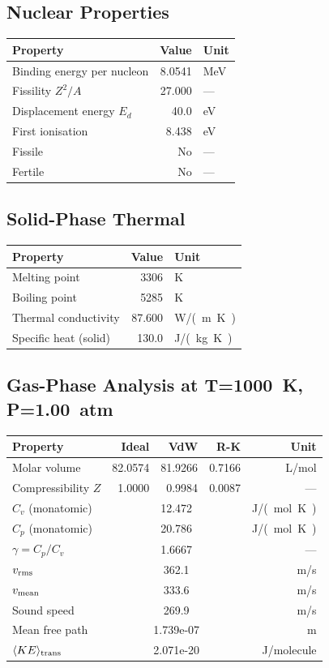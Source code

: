 \documentclass[11pt,a4paper]{article}
\begin{document}
\subsection{Nuclear Properties}
\begin{tabular}{lrl}
  \toprule
  Property & Value & Unit \\
  \midrule
  Binding energy per nucleon & 8.0541 & \si{MeV} \\
  Fissility $Z^2/A$ & 27.000 & --- \\
  Displacement energy $E_d$ & 40.0 & \si{eV} \\
  First ionisation & 8.438 & \si{eV} \\
  Fissile & No & --- \\
  Fertile & No & --- \\
  \bottomrule
\end{tabular}

\subsection{Solid-Phase Thermal}
\begin{tabular}{lrl}
  \toprule
  Property & Value & Unit \\
  \midrule
  Melting point & 3306 & \si{K} \\
  Boiling point & 5285 & \si{K} \\
  Thermal conductivity & 87.600 & \si{W/(m.K)} \\
  Specific heat (solid) & 130.0 & \si{J/(kg.K)} \\
  \bottomrule
\end{tabular}

\subsection{Gas-Phase Analysis at T=\SI{1000}{K}, P=\SI{1.00}{atm}}
\begin{tabular}{lrrrr}
  \toprule
  Property & Ideal & VdW & R-K & Unit \\
  \midrule
  Molar volume & 82.0574 & 81.9266 & 0.7166 & \si{L/mol} \\
  Compressibility $Z$ & 1.0000 & 0.9984 & 0.0087 & --- \\
  \midrule
  $C_v$ (monatomic) & \multicolumn{3}{c}{12.472} & \si{J/(mol.K)} \\
  $C_p$ (monatomic) & \multicolumn{3}{c}{20.786} & \si{J/(mol.K)} \\
  $\gamma = C_p/C_v$ & \multicolumn{3}{c}{1.6667} & --- \\
  $v_{\rm rms}$ & \multicolumn{3}{c}{362.1} & \si{m/s} \\
  $v_{\rm mean}$ & \multicolumn{3}{c}{333.6} & \si{m/s} \\
  Sound speed & \multicolumn{3}{c}{269.9} & \si{m/s} \\
  Mean free path & \multicolumn{3}{c}{1.739e-07} & \si{m} \\
  $\langle KE \rangle_{\rm trans}$ & \multicolumn{3}{c}{2.071e-20} & \si{J/molecule} \\
  \bottomrule
\end{tabular}
\end{document}
